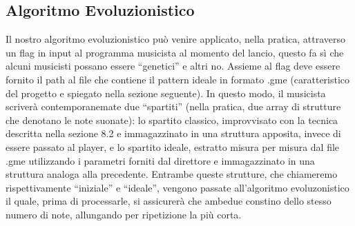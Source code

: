 \subsection{Algoritmo Evoluzionistico}
Il nostro algoritmo evoluzionistico può venire applicato, nella pratica, attraverso un flag in input al programma musicista al momento del lancio, questo fa sì che alcuni musicisti possano essere ``genetici'' e altri no.
Assieme al flag deve essere fornito il path al file che contiene il pattern ideale in formato .gme (caratteristico del progetto e spiegato nella sezione seguente).
In questo modo, il musicista scriverà contemporanemate due ``spartiti'' (nella pratica, due array di strutture che denotano le note suonate): lo spartito classico, improvvisato con la tecnica descritta nella sezione 8.2 e immagazzinato in una struttura apposita, invece di essere passato al player, e lo spartito ideale, estratto misura per misura dal file .gme utilizzando i parametri forniti dal direttore e immagazzinato in una struttura analoga alla precedente.
Entrambe queste strutture, che chiameremo rispettivamente ``iniziale'' e ``ideale'', vengono passate all'algoritmo evoluzonistico il quale, prima di processarle, si assicurerà che ambedue constino dello stesso numero di note, allungando per ripetizione la più corta.
\newline

